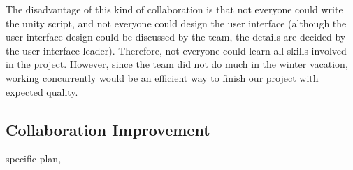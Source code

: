 \documentclass[12pt, a4paper]{report}
\begin{document}
		
		The disadvantage of this kind of collaboration is that not everyone could write the unity script, and not everyone could design the user interface (although the user interface design could be discussed by the team, the details are decided by the user interface leader). Therefore, not everyone could learn all skills involved in the project. However, since the team did not do much in the winter vacation, working concurrently would be an efficient way to finish our project with expected quality.\\
		\subsection{Collaboration Improvement}
		specific plan, 
\end{document}
